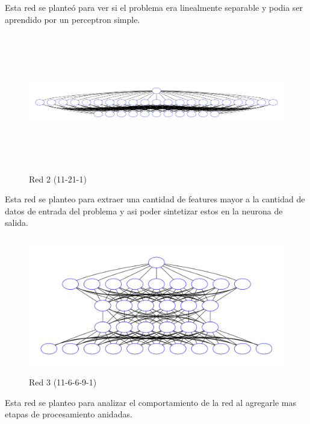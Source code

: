 Esta red se planteó para ver si el problema era linealmente separable y podia ser aprendido por un perceptron simple.

\begin{figure}[H]
  \includegraphics[width=16cm, height=6cm]{../plot/11-21-1.pdf}
  \centering
  \caption{Red 2 (11-21-1)}
\end{figure}

Esta red se planteo para extraer una cantidad de features mayor a la cantidad de datos de entrada del problema y asi poder sintetizar estos en la neurona de salida.

\begin{figure}[H]
  \includegraphics[width=12cm, height=6cm]{../plot/11-6-6-9-1.pdf}
  \centering
  \caption{Red 3 (11-6-6-9-1)}
\end{figure}

Esta red se planteo para analizar el comportamiento de la red al agregarle mas etapas de procesamiento anidadas.

